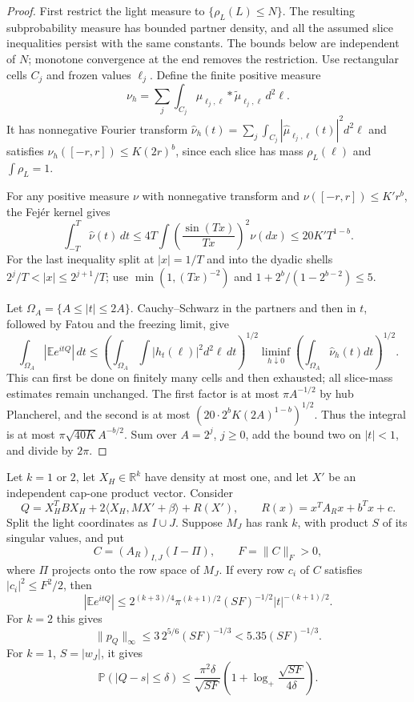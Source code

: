 \begin{proof}
First restrict the light measure to $\{\rho_L(L)\le N\}$.
The resulting subprobability measure has bounded partner density, and
all the assumed slice inequalities persist with the same constants.
The bounds below are independent of $N$; monotone convergence at the
end removes the restriction.  Use rectangular cells $C_j$ and frozen
values $\ell_j$.  Define the
finite positive measure
\[
 \nu_h=\sum_j\int_{C_j}
          \mu_{\ell_j,\ell}*\widetilde\mu_{\ell_j,\ell}\,d^2\ell.
\]
It has nonnegative Fourier transform
$\widehat\nu_h(t)=\sum_j\int_{C_j}|\widehat\mu_{\ell_j,\ell}(t)|^2
d^2\ell$ and satisfies
$\nu_h([-r,r])\le K(2r)^b$, since each slice has mass
$\rho_L(\ell)$ and $\int\rho_L=1$.

For any positive measure $\nu$ with nonnegative transform and
$\nu([-r,r])\le K'r^b$, the Fej\'er kernel gives
\[
 \int_{-T}^T\widehat\nu(t)\,dt
 \le4T\int\left(\frac{\sin(Tx)}{Tx}\right)^2\nu(dx)
 \le20K'T^{1-b}.
\]
For the last inequality split at $|x|=1/T$ and into the dyadic shells
$2^j/T<|x|\le2^{j+1}/T$; use
$\min(1,(Tx)^{-2})$ and
$1+2^b/(1-2^{b-2})\le5$.

Let $\Omega_A=\{A\le|t|\le2A\}$.  Cauchy--Schwarz in the partners
and then in $t$, followed by Fatou and the freezing limit, give
\[
 \int_{\Omega_A}|\mathbb E e^{itQ}|\,dt
 \le \left(\int_{\Omega_A}\int|h_t(\ell)|^2d^2\ell\,dt\right)^{1/2}
       \liminf_{h\downarrow0}
         \left(\int_{\Omega_A}\widehat\nu_h(t)dt\right)^{1/2}.
\]
This can first be done on finitely many cells and then exhausted; all
slice-mass estimates remain unchanged.  The first factor is at most
$\pi A^{-1/2}$ by hub Plancherel, and the second is at most
$(20\cdot2^bK(2A)^{1-b})^{1/2}$.
Thus the integral is at most $\pi\sqrt{40K}A^{-b/2}$.
Sum over $A=2^j$, $j\ge0$, add the bound two on $|t|<1$, and divide
by $2\pi$.
\end{proof}

\begin{proposition}
\label{prop:hub-crossing}
Let $k=1$ or $2$, let $X_H\in\mathbb R^k$ have density at most one,
and let $X'$ be an independent cap-one product vector.  Consider
\[
 Q=X_H^TBX_H+2\langle X_H,MX'+\beta\rangle+R(X'),
 \qquad R(x)=x^TA_Rx+b^Tx+c.
\]
Split the light coordinates as $I\cup J$.  Suppose $M_J$ has rank
$k$, with product $S$ of its singular values, and put
\[
 C=(A_R)_{I,J}(I-\Pi),\qquad F=\|C\|_F>0,
\]
where $\Pi$ projects onto the row space of $M_J$.
If every row $c_i$ of $C$ satisfies $|c_i|^2\le F^2/2$, then
\begin{equation}\label{eq:hub-crossing-fourier}
 |\mathbb E e^{itQ}|\le
 2^{(k+3)/4}\pi^{(k+1)/2}(SF)^{-1/2}|t|^{-(k+1)/2}.
\end{equation}
For $k=2$ this gives
\[
 \|p_Q\|_\infty\le3\,2^{5/6}(SF)^{-1/3}<5.35(SF)^{-1/3}.
\]
For $k=1$, $S=|w_J|$, it gives
\[
 \mathbb P(|Q-s|\le\delta)\le
 \frac{\pi^2\delta}{\sqrt{SF}}
 \left(1+\log_+\frac{\sqrt{SF}}{4\delta}\right).
\]
\end{proposition}

